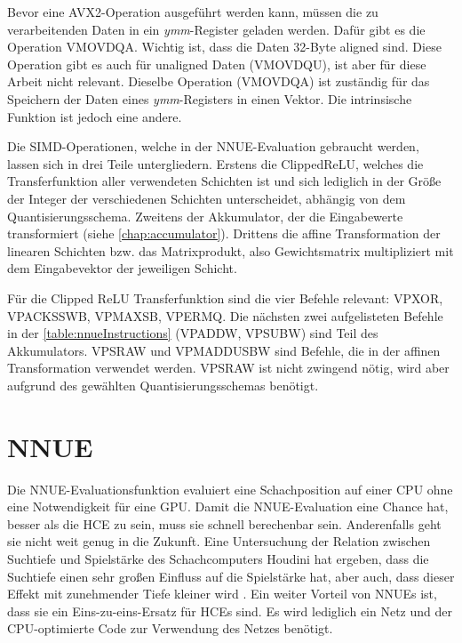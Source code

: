 Bevor eine \ac{AVX2}-Operation ausgeführt werden kann, müssen die zu verarbeitenden Daten in ein \emph{ymm}-Register geladen werden. Dafür gibt es die Operation VMOVDQA. Wichtig ist, dass die Daten 32-Byte aligned sind. Diese Operation gibt es auch für unaligned Daten (VMOVDQU), ist aber für diese Arbeit nicht relevant. Dieselbe Operation (VMOVDQA) ist zuständig für das Speichern der Daten eines \emph{ymm}-Registers in einen Vektor. Die intrinsische Funktion ist jedoch eine andere.

Die \ac{SIMD}-Operationen, welche in der \ac{NNUE}-Evaluation gebraucht werden, lassen sich in drei Teile untergliedern. Erstens die Clipped\ac{ReLU}, welches die Transferfunktion aller verwendeten Schichten ist und sich lediglich in der Größe der Integer der verschiedenen Schichten unterscheidet, abhängig von dem Quantisierungsschema. Zweitens der Akkumulator, der die Eingabewerte transformiert (siehe \autoref{chap:accumulator}). Drittens die affine Transformation der linearen Schichten bzw. das Matrixprodukt, also Gewichtsmatrix multipliziert mit dem Eingabevektor der jeweiligen Schicht.

Für die Clipped \ac{ReLU} Transferfunktion sind die vier Befehle relevant: VPXOR, VPACKSSWB, VPMAXSB, VPERMQ. Die nächsten zwei aufgelisteten Befehle in der \autoref{table:nnueInstructions} (VPADDW, VPSUBW) sind Teil des Akkumulators. VPSRAW und VPMADDUSBW sind Befehle, die in der affinen Transformation verwendet werden. VPSRAW ist nicht zwingend nötig, wird aber aufgrund des gewählten Quantisierungsschemas benötigt.



\section{NNUE}

Die \ac{NNUE}-Evaluationsfunktion evaluiert eine Schachposition auf einer CPU ohne eine Notwendigkeit für eine GPU. Damit die \ac{NNUE}-Evaluation eine Chance hat, besser als die \ac{HCE} zu sein, muss sie schnell berechenbar sein. Anderenfalls geht sie nicht weit genug in die Zukunft. Eine Untersuchung der Relation zwischen Suchtiefe und Spielstärke des Schachcomputers Houdini \citeyear{Ferreira2013} hat ergeben, dass die Suchtiefe einen sehr großen Einfluss auf die Spielstärke hat, aber auch, dass dieser Effekt mit zunehmender Tiefe kleiner wird \cite{Ferreira2013}. Ein weiter Vorteil von \acp{NNUE} ist, dass sie ein Eins-zu-eins-Ersatz für \acp{HCE} sind. Es wird lediglich ein Netz und der CPU-optimierte Code zur Verwendung des Netzes benötigt.

